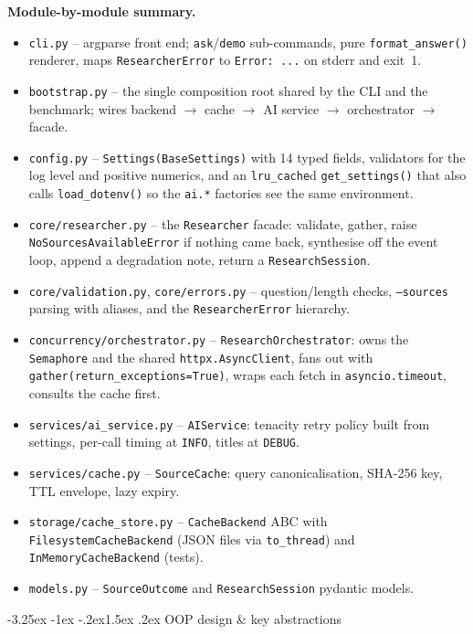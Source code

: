 \documentclass[11pt,a4paper]{article}
\makeatletter
\renewcommand\subsection{\@startsection{subsection}{2}{\z@}%
    {-3.25ex \@plus -1ex \@minus -.2ex}{1.5ex \@plus .2ex}%
    {\normalfont\large\bfseries\color{accent}}}%
\makeatother
\begin{document}
\textbf{Module-by-module summary.}
\begin{itemize}[leftmargin=1.4em,itemsep=1pt]
  \item \texttt{cli.py} -- argparse front end; \texttt{ask}/\texttt{demo} sub-commands, pure \texttt{format\_answer()} renderer, maps \texttt{ResearcherError} to \texttt{Error: ...} on stderr and exit~1.
  \item \texttt{bootstrap.py} -- the single composition root shared by the CLI and the benchmark; wires backend $\to$ cache $\to$ AI service $\to$ orchestrator $\to$ facade.
  \item \texttt{config.py} -- \texttt{Settings(BaseSettings)} with 14 typed fields, validators for the log level and positive numerics, and an \texttt{lru\_cache}d \texttt{get\_settings()} that also calls \texttt{load\_dotenv()} so the \texttt{ai.*} factories see the same environment.
  \item \texttt{core/researcher.py} -- the \texttt{Researcher} facade: validate, gather, raise \texttt{NoSourcesAvailableError} if nothing came back, synthesise off the event loop, append a degradation note, return a \texttt{ResearchSession}.
  \item \texttt{core/validation.py}, \texttt{core/errors.py} -- question/length checks, \texttt{--sources} parsing with aliases, and the \texttt{ResearcherError} hierarchy.
  \item \texttt{concurrency/orchestrator.py} -- \texttt{ResearchOrchestrator}: owns the \texttt{Semaphore} and the shared \texttt{httpx.AsyncClient}, fans out with \texttt{gather(return\_exceptions=True)}, wraps each fetch in \texttt{asyncio.timeout}, consults the cache first.
  \item \texttt{services/ai\_service.py} -- \texttt{AIService}: tenacity retry policy built from settings, per-call timing at \texttt{INFO}, titles at \texttt{DEBUG}.
  \item \texttt{services/cache.py} -- \texttt{SourceCache}: query canonicalisation, SHA-256 key, TTL envelope, lazy expiry.
  \item \texttt{storage/cache\_store.py} -- \texttt{CacheBackend} ABC with \texttt{FilesystemCacheBackend} (JSON files via \texttt{to\_thread}) and \texttt{InMemoryCacheBackend} (tests).
  \item \texttt{models.py} -- \texttt{SourceOutcome} and \texttt{ResearchSession} pydantic models.
\end{itemize}

\subsection{OOP design \& key abstractions}
\end{document}
